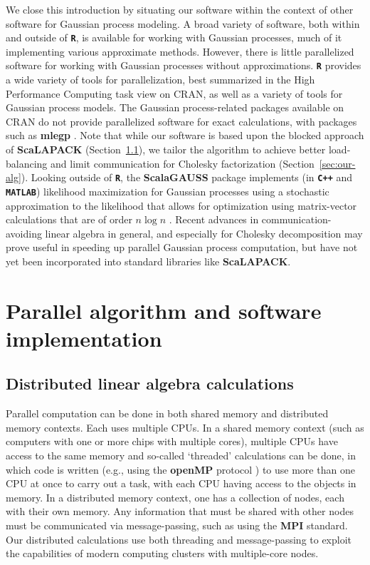 \documentclass[12pt]{article}
\newcommand{\proglang}[1]{\textbf{\texttt{#1}}}
\newcommand{\pkg}[1]{\textbf{#1}}
\begin{document}
We close this introduction by situating our software within the context of other software for Gaussian process modeling. A broad variety of software, both within and outside of \proglang{R}, is available for working with Gaussian processes, much of it implementing various approximate methods. However, there is little parallelized software for working with Gaussian processes without approximations. \proglang{R} provides a wide variety of tools for parallelization, best summarized in the High Performance Computing task view on CRAN, as well as a variety of tools for Gaussian process models. The Gaussian process-related packages available on CRAN do not provide parallelized software for exact calculations, with packages such as \pkg{mlegp} \citep{Danc:etal:2008}. Note that while our software is based upon the blocked approach of \pkg{ScaLAPACK} (Section~\ref{sec:block-chol}), we tailor the algorithm to achieve better load-balancing and limit communication for Cholesky factorization (Section~\ref{sec:our-alg}).
Looking outside of \proglang{R}, the \pkg{ScalaGAUSS} package \citep{scalaGauss} implements (in \proglang{C++} and \proglang{MATLAB}) likelihood maximization for Gaussian processes using a stochastic approximation to the likelihood that allows for optimization using matrix-vector calculations that are of order $n\log n$ \citep{Anit:etal:2012}.  Recent advances in communication-avoiding linear algebra \citep{BDHS11} in general, and especially for Cholesky decomposition \citep{GGSYTY12} may prove useful in speeding up parallel Gaussian process computation, but have not yet been incorporated into standard libraries like \pkg{ScaLAPACK}.




\section{Parallel algorithm and software implementation}

\subsection{Distributed linear algebra calculations}
\label{sec:block-chol}
Parallel computation can be done in both shared memory and distributed memory contexts. Each uses multiple CPUs. In a shared memory context (such as computers with one or more chips with multiple cores), multiple CPUs have access to the same memory and so-called `threaded' calculations can be done, in which code is written (e.g., using the \pkg{openMP} protocol \citep{openMP}) to use more than one CPU at once to carry out a task, with each CPU having access to the objects in memory. In a distributed memory context, one has a collection of nodes, each with their own memory. Any information that must be shared with other nodes must be communicated via message-passing, such as using the \pkg{MPI} standard. Our distributed calculations use both threading and message-passing to exploit the capabilities of modern computing clusters with multiple-core nodes.
\end{document}
